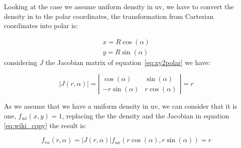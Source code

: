 Looking at the case we assume uniform density in uv, we have to convert the density in to the polar coordinates, the transformation from Cartesian coordinates into polar is:

\begin{equation} 
\begin{array}{c}
x=R\cos(\alpha) \\
y=R\sin(\alpha)
\end{array}
\label{eq:xy2polar}
\end{equation}
%
considering $J$ the Jacobian matrix of equation~\ref{eq:xy2polar} we have:

\begin{equation}
|J(r,\alpha)|= \left |
\begin{array} {cc}
\cos(\alpha) & \sin(\alpha) \\
-r\sin(\alpha) & r\cos(\alpha)
\end{array} \right |=r
\end{equation}

As we assume that we have a uniform density in uv, we can consider that it is one, $f_{ux}(x,y)=1$, replacing the the density and the Jacobian in equation \ref{eq:wiki_copy} the result is:

\begin{equation}
f_{r\alpha}(r,\alpha)=|J(r,\alpha)|f_{ux}(r\cos(\alpha), r\sin(\alpha))=r
\end{equation} 


%

